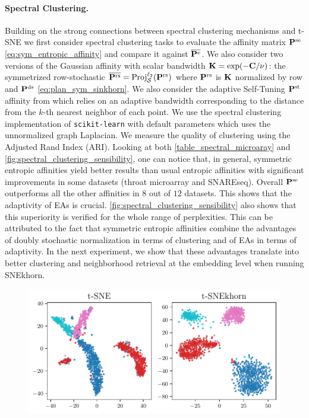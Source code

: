 \paragraph{Spectral Clustering.}
Building on the strong connections between spectral clustering mechanisms and t-SNE
\citep{van2022probabilistic,linderman2019clustering} we first consider spectral
clustering tasks to evaluate the affinity matrix $\mathbf{P}^{\mathrm{se}}$
\eqref{eq:sym_entropic_affinity} and compare it against
$\overline{\mathbf{P}^{\mathrm{e}}}$. We also consider two
versions of the Gaussian affinity with scalar bandwidth $\mathbf{K} = \exp(-\mathbf{C}/\nu)$:
the symmetrized row-stochastic $\overline{\mathbf{P}^{\mathrm{rs}}} =
\operatorname{Proj}^{\ell_2}_{\mathcal{S}}(\mathbf{P}^{\mathrm{rs}})$ where
$\mathbf{P}^{\mathrm{rs}}$ is $\mathbf{K}$ normalized by row and $\mathbf{P}^{\mathrm{ds}}$
\eqref{eq:plan_sym_sinkhorn}. We also consider the adaptive Self-Tuning
$\mathbf{P}^{\mathrm{st}}$ affinity from \citep{zelnik2004self} which relies on an
adaptive bandwidth corresponding to the distance from the $k$-th nearest
neighbor of each point. We use the spectral clustering implementation of
\texttt{scikit-learn} \citep{scikit-learn} with default parameters which uses the
unnormalized graph Laplacian. We measure the quality of clustering using the
Adjusted Rand Index (ARI). Looking at both \cref{table_spectral_microaray} and
\cref{fig:spectral_clustering_sensibility}, one can notice that, in general,
symmetric entropic affinities yield better results than usual entropic
affinities with significant improvements in some datasets (\eg throat microarray
and SNAREseq). Overall $\mathbf{P}^{\mathrm{se}}$ outperforms all the other affinities
in $8$ out of $12$ datasets. This shows that the adaptivity of EAs is crucial.
\cref{fig:spectral_clustering_sensibility} also shows that this
superiority is verified for the whole range of perplexities. This can be
attributed to the fact that symmetric entropic affinities combine the advantages
of doubly stochastic normalization in terms of clustering and of EAs in terms of
adaptivity. In the next experiment, we show that these advantages translate into
better clustering and neighborhood retrieval at the embedding level when running
SNEkhorn.

\begin{figure}
    \centerline{\includegraphics[width=0.7\linewidth]{figures/SNEkhorn/fig_sc.pdf}}
    \label{fig:sc}
\end{figure}

